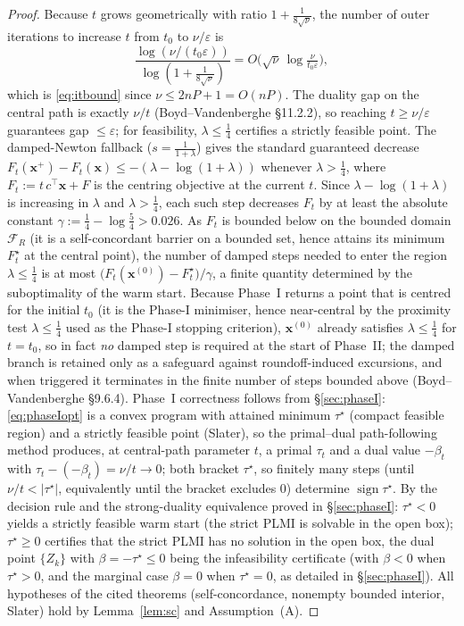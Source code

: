 \documentclass{amsart}
\begin{document}
\begin{proof}
Because $t$ grows geometrically with ratio $1+\frac1{8\sqrt\nu}$, the number of outer
iterations to increase $t$ from $t_0$ to $\nu/\varepsilon$ is
\[
  \frac{\log(\nu/(t_0\varepsilon))}{\log(1+\tfrac1{8\sqrt\nu})}
  = O\!\big(\sqrt\nu\,\log\tfrac{\nu}{t_0\varepsilon}\big),
\]
which is \eqref{eq:itbound} since $\nu\le2nP+1=O(nP)$. The duality gap on the central path is
exactly $\nu/t$ (Boyd--Vandenberghe \S11.2.2), so reaching $t\ge\nu/\varepsilon$
guarantees gap $\le\varepsilon$; for feasibility, $\lambda\le\frac14$ certifies a
strictly feasible point. The damped-Newton fallback ($s=\frac1{1+\lambda}$) gives the
standard guaranteed decrease $F_t(\bm x^+)-F_t(\bm x)\le-(\lambda-\log(1+\lambda))$
whenever $\lambda>\frac14$, where $F_t:=t\,c^{\!\top}\bm x+F$ is the centring objective
at the current $t$. Since $\lambda-\log(1+\lambda)$ is increasing in $\lambda$ and
$\lambda>\frac14$, each such step decreases $F_t$ by at least the absolute constant
$\gamma:=\tfrac14-\log\tfrac54>0.026$. As $F_t$ is bounded below on the bounded
domain $\mathcal F_R$ (it is a self-concordant barrier on a bounded set, hence attains
its minimum $F_t^\star$ at the central point), the number of damped steps needed to
enter the region $\lambda\le\frac14$ is at most
$\big(F_t(\bm x^{(0)})-F_t^\star\big)/\gamma$, a finite quantity determined by the
suboptimality of the warm start. Because Phase~I returns a point that is centred for
the initial $t_0$ (it is the Phase-I minimiser, hence near-central by the proximity
test $\lambda\le\frac14$ used as the Phase-I stopping criterion), $\bm x^{(0)}$ already
satisfies $\lambda\le\frac14$ for $t=t_0$, so in fact \emph{no} damped step is required
at the start of Phase~II; the damped branch is retained only as a safeguard against
roundoff-induced excursions, and when triggered it terminates in the finite number of
steps bounded above (Boyd--Vandenberghe \S9.6.4).
Phase~I correctness follows from \S\ref{sec:phaseI}: \eqref{eq:phaseIopt} is a convex
program with attained minimum $\tau^\star$ (compact feasible region) and a strictly
feasible point (Slater), so the primal--dual path-following method produces, at
central-path parameter $t$, a primal $\tau_t$ and a dual value $-\beta_t$ with
$\tau_t-(-\beta_t)=\nu/t\to0$; both bracket $\tau^\star$, so finitely many steps
(until $\nu/t<|\tau^\star|$, equivalently until the bracket excludes $0$) determine
$\operatorname{sign}\tau^\star$. By the decision rule and the strong-duality
equivalence proved in \S\ref{sec:phaseI}: $\tau^\star<0$ yields a strictly feasible
warm start (the strict PLMI is solvable in the open box); $\tau^\star\ge0$ certifies
that the strict PLMI has no solution in the open box, the dual point $\{Z_k\}$ with
$\beta=-\tau^\star\le0$ being the infeasibility certificate (with $\beta<0$ when
$\tau^\star>0$, and the marginal case $\beta=0$ when $\tau^\star=0$, as detailed in
\S\ref{sec:phaseI}). All hypotheses of the cited theorems (self-concordance, nonempty
bounded interior, Slater) hold by Lemma~\ref{lem:sc} and Assumption~(A).
\end{proof}
\end{document}
